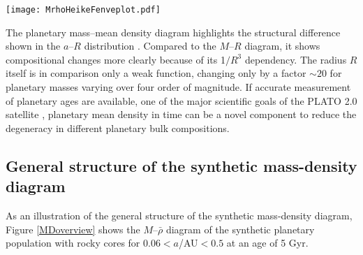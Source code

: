 \documentclass[]{emulateapj}
\begin{document}
\begin{figure*}[htb]
\begin{center}
 \texttt{[image: MrhoHeikeFenveplot.pdf]}
 \caption{Mass versus mean density for the synthetic population with rocky cores at an age of 5 Gyr {exhibiting the characteristic  broken V-shape}. The colors indicate the mass fraction of the H/He envelope at this time. Larger gray circles additionally show when $M_{\rm env}/M_{\rm tot}>0.5$, i.e., it shows the transition to gas-dominated planets. Black symbols are planets that have lost all primordial H/He. The shape of the colored points represents a planet's semimajor axis: open circles if $0.06<a$/AU$<0.15$ and filled squares if $0.15<a$/AU$<0.5$.   }
  \label{MDoverview}
\end{center}
\end{figure*}  
  
The planetary mass--mean density diagram highlights the structural difference shown in the $a$--$R$ distribution \citep{Rauer2013,HatzesRauer2015}. Compared to the $M$--$R$ diagram, it shows compositional changes more clearly because of its 1$/R^{3}$ dependency. The radius $R$ itself is in comparison only a weak function, changing only by a factor $\sim20$ for planetary masses varying over four order of magnitude. If accurate measurement of planetary ages are available, one of the major scientific goals of the PLATO 2.0 satellite \citep{Rauer2013}, planetary mean density in time can be a novel component to reduce the degeneracy in different planetary bulk compositions.

\subsection{General structure of the synthetic mass-density diagram}
As an illustration of the general structure of the synthetic mass-density diagram, Figure \ref{MDoverview} shows the  $M$--$\bar{\rho}$ diagram of the  synthetic planetary population with rocky cores for $0.06<a$/AU$<0.5$ at an age of 5 Gyr. 
\end{document}

